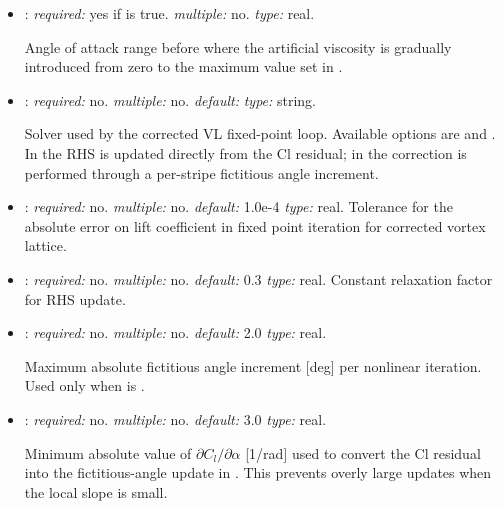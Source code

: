 \begin{itemize}
Angle of attack after which the full artificial viscosity is introduced, 
thus after which the maximum regularization is operated. Should be set 
around or over the stall angle

\item {}: \textit{required:} 
yes if  is true. \textit{multiple:} no. 
\textit{type:} real.

Angle of attack range before  
where the artificial viscosity is gradually introduced from zero to the maximum 
value set in .

\item {}: \textit{required:} no. \textit{multiple:} no.
\textit{default:}  \textit{type:} string.

Solver used by the corrected VL fixed-point loop. Available options are
 and . In  the RHS is
updated directly from the Cl residual; in  the correction is
performed through a per-stripe fictitious angle increment.

\item {}: \textit{required:} no. \textit{multiple:} no. 
\textit{default:} 1.0e-4 \textit{type:} real. 
Tolerance for the absolute error on lift coefficient in fixed point 
iteration for corrected vortex lattice.

\item {}: \textit{required:} no. \textit{multiple:} no. 
\textit{default:} 0.3 \textit{type:} real. 
Constant relaxation factor for RHS update.

\item {}: \textit{required:} no. \textit{multiple:} no.
\textit{default:} 2.0 \textit{type:} real.

Maximum absolute fictitious angle increment [deg] per nonlinear iteration.
Used only when  is .

\item {}: \textit{required:} no. \textit{multiple:} no.
\textit{default:} 3.0 \textit{type:} real.

Minimum absolute value of $\partial C_l/\partial\alpha$ [1/rad] used to convert
the Cl residual into the fictitious-angle update in . This
prevents overly large updates when the local slope is small.


\end{itemize}
